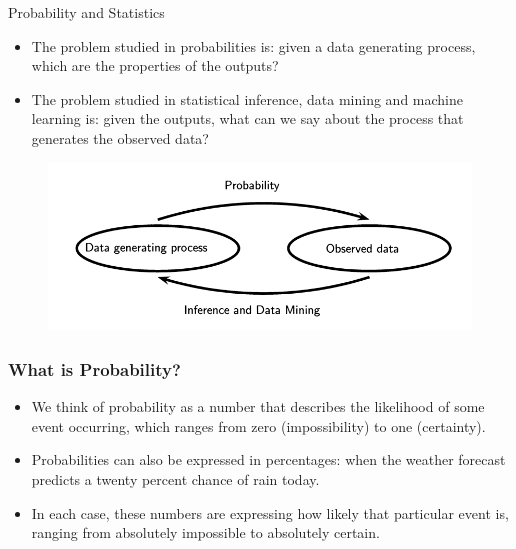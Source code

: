 \documentclass[handout]{beamer}
\begin{document}
\begin{frame}{Probability and Statistics}

\scriptsize{
\begin{itemize}
  \item The problem studied in probabilities is: given a data generating process, which are the properties of the outputs?
 \item The problem studied in statistical inference, data mining and machine learning is: given the outputs, what can we say about the process that generates the observed data? 
\end{itemize}

}
\begin{figure}[h!]
	\centering
	\includegraphics[scale=0.3]{pics/probandstats.png}
\end{figure}


\end{frame}

\begin{frame}\frametitle{What is Probability?}
\scriptsize{

\begin{itemize}
 \item We think of probability as a number that describes the likelihood of some event occurring, which ranges from zero (impossibility) to one (certainty).
 \item Probabilities can also be expressed in percentages: when the weather forecast predicts a twenty percent chance of rain today. 
 \item In each case, these numbers are expressing how likely that particular event is, ranging from absolutely impossible to absolutely certain.
\end{itemize}

}

\end{frame}
\end{document}
